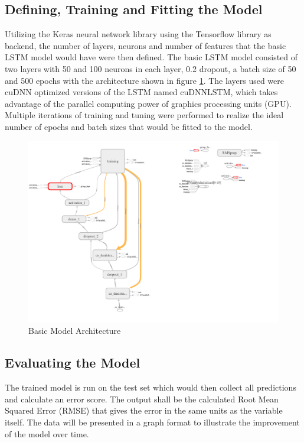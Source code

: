 \documentclass[10pt,11pt,12pt,oneside]{book}
\begin{document}
    \subsection{Defining, Training and Fitting the Model}
    Utilizing the Keras neural network library \cite{chollet2015keras} using the Tensorflow library \cite{tensorflow2015-whitepaper} as backend, the number of layers, neurons and number of features that the basic LSTM model would have were then defined. The basic LSTM model consisted of two layers with 50 and 100 neurons in each layer, 0.2 dropout, a batch size of 50 and 500 epochs with the architecture shown in figure \ref{fig:basic_arch}. The layers used were cuDNN\cite{Chetlur2014cuDNNEP} optimized versions of the LSTM named cuDNNLSTM, which takes advantage of the parallel computing power of graphics processing units (GPU). Multiple iterations of training and tuning were performed to realize the ideal number of epochs and batch sizes that would be fitted to the model.
\begin{figure}[H]
\includegraphics[width=\linewidth]{basic_architecture.png}
\caption{Basic Model Architecture}
\label{fig:basic_arch}
\end{figure}
    \subsection{Evaluating the Model}
    The trained model is run on the test set which would then collect all predictions and calculate an error score. The output shall be the calculated Root Mean Squared Error (RMSE) that gives the error in the same units as the variable itself. The data will be presented in a graph format to illustrate the improvement of the model over time.
\end{document}
